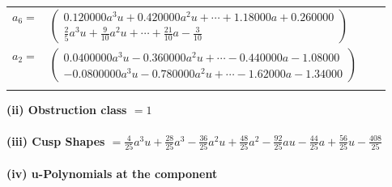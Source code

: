 \documentclass[1p]{elsarticle_modified}
\theoremstyle{definition}
\begin{document}
\begin{tabular}{m{7pt} m{180pt} m{7pt} m{180pt} }
\flushright $a_{6}=$&$\begin{pmatrix}0.120000 a^{3} u+0.420000 a^{2} u+\cdots+1.18000 a+0.260000\\\frac{2}{5} a^3 u+\frac{9}{10} a^2 u+\cdots+\frac{21}{10} a-\frac{3}{10}\end{pmatrix}$ \\
\flushright $a_{2}=$&$\begin{pmatrix}0.0400000 a^{3} u-0.360000 a^{2} u+\cdots-0.440000 a-1.08000\\-0.0800000 a^{3} u-0.780000 a^{2} u+\cdots-1.62000 a-1.34000\end{pmatrix}$\\&\end{tabular}
\flushleft \textbf{(ii) Obstruction class $= 1$}\\~\\
\flushleft \textbf{(iii) Cusp Shapes $= \frac{4}{25} a^3 u+\frac{28}{25} a^3-\frac{36}{25} a^2 u+\frac{48}{25} a^2-\frac{92}{25} a u-\frac{44}{25} a+\frac{56}{25} u-\frac{408}{25}$}\\~\\
\newpage\renewcommand{\arraystretch}{1}
\flushleft \textbf{(iv) u-Polynomials at the component}\newline \\
\end{document}
